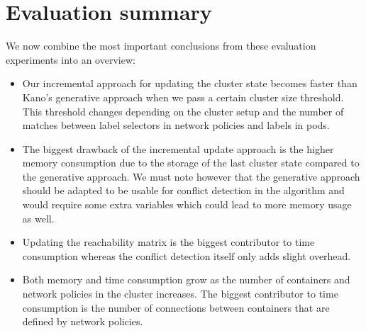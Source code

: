 \section{Evaluation summary} \label{sec:conclusion}
We now combine the most important conclusions from these evaluation experiments into an overview:
\begin{itemize}
	\item Our incremental approach for updating the cluster state becomes faster than Kano's generative approach when we pass a certain cluster size threshold. This threshold changes depending on the cluster setup and the number of matches between label selectors in network policies and labels in pods. 
	\item The biggest drawback of the incremental update approach is the higher memory consumption due to the storage of the last cluster state compared to the generative approach. We must note however that the generative approach should be adapted to be usable for conflict detection in the algorithm and would require some extra variables which could lead to more memory usage as well.
	\item Updating the reachability matrix is the biggest contributor to time consumption whereas the conflict detection itself only adds slight overhead.
	\item Both memory and time consumption grow as the number of containers and network policies in the cluster increases. The biggest contributor to time consumption is the number of connections between containers that are defined by network policies.
\end{itemize}

\cleardoublepage
